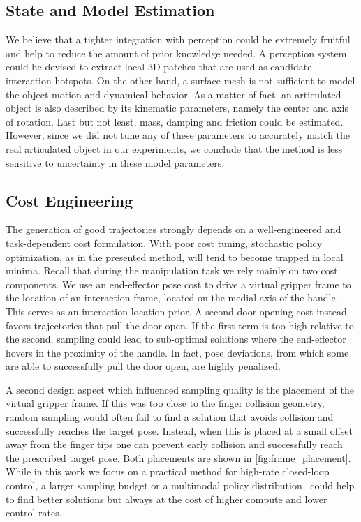 \subsection{State and Model Estimation}
We believe that a tighter integration with perception could be extremely fruitful and help to reduce the amount of prior knowledge needed. A perception system could be devised to extract local 3D patches that are used as candidate interaction hotspots. On the other hand, a surface mesh is not sufficient to model the object motion and dynamical behavior. As a matter of fact, an articulated object is also described by its kinematic parameters, namely the center and axis of rotation. Last but not least, mass, damping and friction could be estimated. However, since we did not tune any of these parameters to accurately match the real articulated object in our experiments, we conclude that the method is less sensitive to uncertainty in these model parameters.

\subsection{Cost Engineering}
The generation of good trajectories strongly depends on a well-engineered and task-dependent cost formulation. With poor cost tuning, stochastic policy optimization, as in the presented method, will tend to become trapped in local minima. Recall that during the manipulation task we rely mainly on two cost components. We use an end-effector pose cost to drive a virtual gripper frame to the location of an interaction frame, located on the medial axis of the handle. This serves as an interaction location prior. A second door-opening cost instead favors trajectories that pull the door open. If the first term is too high relative to the second, sampling could lead to sub-optimal solutions where the end-effector hovers in the proximity of the handle. In fact, pose deviations, from which some are able to successfully pull the door open, are highly penalized.

A second design aspect which influenced sampling quality is the placement of the virtual gripper frame. If this was too close to the finger collision geometry, random sampling would often fail to find a solution that avoids collision and successfully reaches the target pose. Instead, when this is placed at a small offset away from the finger tips one can prevent early collision and successfully reach the prescribed target pose. Both placements are shown in \fig \ref{fig:frame_placement}. While in this work we focus on a practical method for high-rate closed-loop control, a larger sampling budget or a multimodal policy distribution~\cite{lambert_stein_2020} could help to find better solutions but always at the cost of higher compute and lower control rates.

